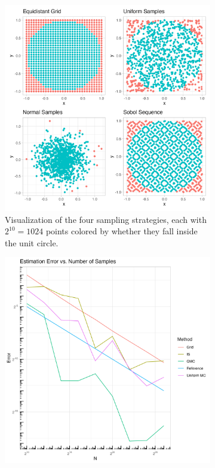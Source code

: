 \begin{figure}[h]
    \centering
    \begin{subfigure}[b]{0.48\textwidth}
        \centering
        \includegraphics[width=\textwidth]{figures/ex1-samples.png}
        \caption{Visualization of the four sampling strategies, each with $2^{10} = 1024$ points colored by whether they fall inside the unit circle.}
        \label{fig:ex1-samples}
    \end{subfigure}
    \hfill
    \begin{subfigure}[b]{0.48\textwidth}
        \centering
        \includegraphics[width=\textwidth]{figures/ex1-estimation-error.png}

\end{subfigure}
\end{figure}
